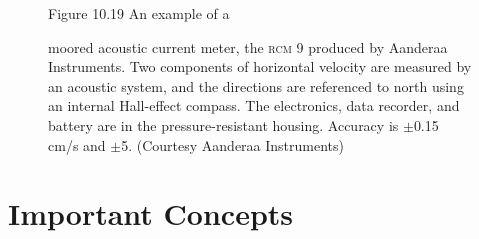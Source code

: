 \begin{figure}[t!]
\footnotesize
Figure 10.19 An example of a \rule{0mm}{5ex}moored acoustic current
meter, the \textsc{rcm 9} produced by Aanderaa Instruments. Two
components of horizontal velocity are measured by an acoustic system,
and the directions are referenced to north using an internal
Hall-effect compass. The electronics, data recorder, and battery are
in the pressure-resistant housing. Accuracy is $\pm$0.15 cm/s and $\pm$5\degrees. (Courtesy Aanderaa
Instruments)
\label{fig:RCM9}
\vspace{-2ex}
\end{figure}

\section{Important Concepts}
